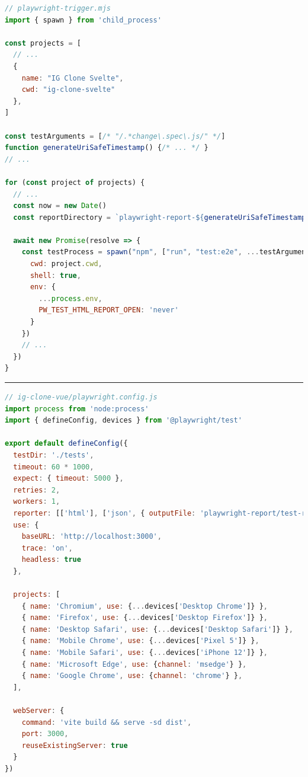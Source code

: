 \documentclass[a4paper, 12pt]{article}
\begin{document}
\pagebreak
\begin{lstlisting}[caption={Trigger script for Playwright tests}, label={lst:playwright-trigger}, language=JavaScript]
// playwright-trigger.mjs
import { spawn } from 'child_process'

const projects = [
  // ...
  {
    name: "IG Clone Svelte",
    cwd: "ig-clone-svelte"
  },
]

const testArguments = [/* "/.*change\.spec\.js/" */]
function generateUriSafeTimestamp() {/* ... */ }
// ...

for (const project of projects) {
  // ...
  const now = new Date()
  const reportDirectory = `playwright-report-${generateUriSafeTimestamp()}`

  await new Promise(resolve => {
    const testProcess = spawn("npm", ["run", "test:e2e", ...testArguments], {
      cwd: project.cwd,
      shell: true,
      env: {
        ...process.env,
        PW_TEST_HTML_REPORT_OPEN: 'never'
      }
    })
    // ...
  })
}
\end{lstlisting}
\hrule
\begin{lstlisting}[caption={Playwright configuration for Vue.js}, label={lst:playwright-config}, language=JavaScript]
// ig-clone-vue/playwright.config.js
import process from 'node:process'
import { defineConfig, devices } from '@playwright/test'

export default defineConfig({
  testDir: './tests',
  timeout: 60 * 1000,
  expect: { timeout: 5000 },
  retries: 2,
  workers: 1,
  reporter: [['html'], ['json', { outputFile: 'playwright-report/test-results.json' }]],
  use: {
    baseURL: 'http://localhost:3000',
    trace: 'on',
    headless: true
  },

  projects: [
    { name: 'Chromium', use: {...devices['Desktop Chrome']} },
    { name: 'Firefox', use: {...devices['Desktop Firefox']} },
    { name: 'Desktop Safari', use: {...devices['Desktop Safari']} },
    { name: 'Mobile Chrome', use: {...devices['Pixel 5']} },
    { name: 'Mobile Safari', use: {...devices['iPhone 12']} },
    { name: 'Microsoft Edge', use: {channel: 'msedge'} },
    { name: 'Google Chrome', use: {channel: 'chrome'} },
  ],

  webServer: {
    command: 'vite build && serve -sd dist',
    port: 3000,
    reuseExistingServer: true
  }
})

\end{lstlisting}
\vspace{1cm}
\end{document}
